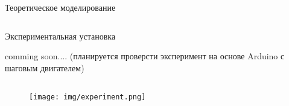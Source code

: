 \begin{frame}{Теоретическое моделирование}
\begin{columns}
%
%
%

	\end{columns}

\end{frame}

\begin{frame}{Экспериментальная установка}

	\begin{block}{}
		comming soon.... (планируется проверсти эксперимент на основе Arduino с шаговым двигателем)
	\end{block}

	\begin{columns}

		\begin{column}{1\linewidth}
			\begin{figure}[H]
				\texttt{[image: img/experiment.png]}
			\end{figure}

		\end{column}

	\end{columns}

%
%
%
%
%
%

\end{frame}

